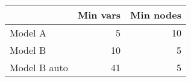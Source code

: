 
\begin{tabular}{l|r|r}
\hline
  & Min vars & Min nodes\\
\hline
Model A & 5 & 10\\
\hline
Model B & 10 & 5\\
\hline
Model B auto & 41 & 5\\
\hline
\end{tabular}